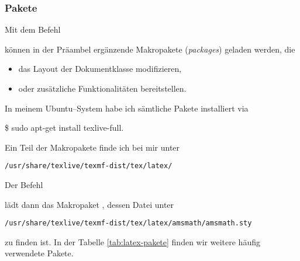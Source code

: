 \subsubsection{Pakete}
Mit dem Befehl
\begin{center}
\end{center}
können in der Präambel ergänzende Makropakete (\textit{packages}) geladen werden, die
\begin{itemize}
	\item das Layout der Dokumentklasse modifizieren,
	\item oder zusätzliche Funktionalitäten bereitstellen.
\end{itemize}
In meinem Ubuntu--System habe ich sämtliche Pakete installiert via
\begin{center}
	\$ sudo apt-get install texlive-full.
\end{center}
Ein Teil der Makropakete finde ich bei mir unter
\begin{center}
	\texttt{/usr/share/texlive/texmf-dist/tex/latex/}
\end{center}
Der Befehl
\begin{center}
\end{center}
lädt dann das Makropaket , dessen  Datei unter
\begin{center}
	\texttt{/usr/share/texlive/texmf-dist/tex/latex/amsmath/amsmath.sty}
\end{center}
zu finden ist. In der Tabelle \ref{tab:latex-pakete} finden wir weitere häufig verwendete Pakete.
~\\~\\

